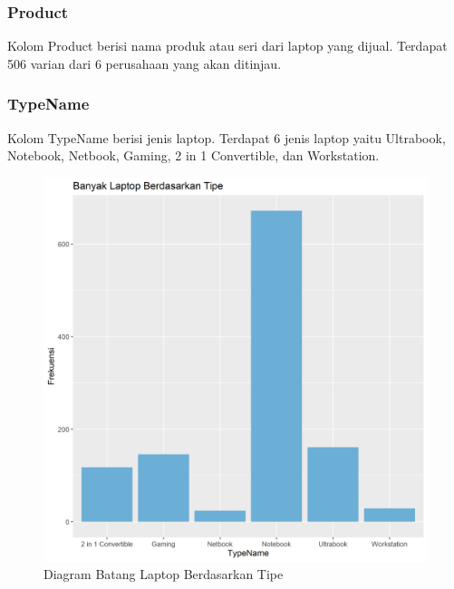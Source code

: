 \documentclass[12pt]{article}
\begin{document}
\subsubsection{Product}
Kolom Product berisi nama produk atau seri dari laptop yang dijual. Terdapat 506 varian dari 6 perusahaan yang akan ditinjau. 
\subsubsection{TypeName}
Kolom TypeName berisi jenis laptop. Terdapat 6 jenis laptop yaitu Ultrabook, Notebook, Netbook, Gaming, 2 in 1 Convertible, dan Workstation. 
\begin{figure}[h!]
    \centering
    \includegraphics[scale = 0.4]{barplot1.png}
    \caption{Diagram Batang Laptop Berdasarkan Tipe}
    \label{ahay}
\end{figure}
\end{document}
